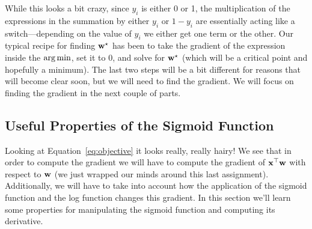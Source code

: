 \documentclass[assignment03_Solutions]{subfiles}
\begin{document}
While this looks a bit crazy, since $y_i$ is either 0 or 1, the multiplication of the expressions in the summation by either $y_i$ or $1-y_i$ are essentially acting like a switch---depending on the value of $y_i$ we either get one term or the other.  Our typical recipe for finding $\mathbf{w}^\star$ has been to take the gradient of the expression inside the $\operatorname*{arg\,min}$, set it to $0$, and solve for $\mathbf{w}^\star$ (which will be a critical point and hopefully a minimum).  The last two steps will be a bit different for reasons that will become clear soon, but we will need to find the gradient.  We will focus on finding the gradient in the next couple of parts.

\subsection{Useful Properties of the Sigmoid Function}

Looking at Equation~\ref{eq:objective} it looks really, really hairy!  We see that in order to compute the gradient we will have to compute the gradient of $\mathbf{x}^\top \mathbf{w}$ with respect to $\mathbf{w}$ (we just wrapped our minds around this last assignment).  Additionally, we will have to take into account how the application of the sigmoid function and the log function changes this gradient.  In this section we'll learn some properties for manipulating the sigmoid function and computing its derivative.
\end{document}
